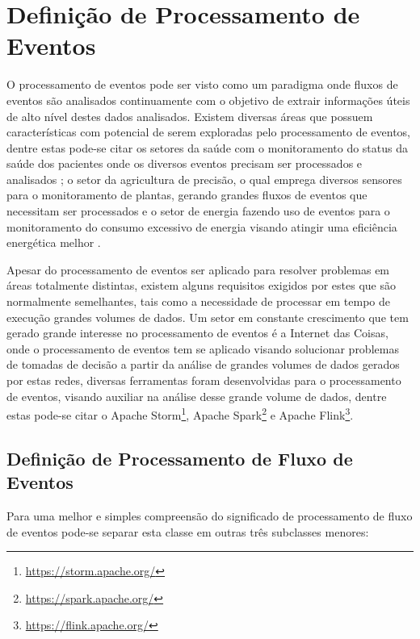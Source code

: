 \documentclass[ti,table]{texufpel} %
\begin{document}
\section{Definição de Processamento de Eventos} 

O processamento de eventos pode ser visto como um paradigma onde fluxos de eventos são analisados continuamente com o objetivo de extrair informações úteis de alto nível destes dados analisados. Existem diversas áreas que possuem características com potencial de serem exploradas pelo processamento de eventos, dentre estas pode-se citar os setores da saúde com o monitoramento do status da saúde dos pacientes onde os diversos eventos precisam ser processados e analisados \cite{weiner2008health}; o setor da agricultura de precisão, o qual emprega diversos sensores para o monitoramento de plantas, gerando grandes fluxos de eventos que necessitam ser processados \cite{garcia2011wireless} e o setor de energia fazendo uso de eventos para o monitoramento do consumo excessivo de energia visando atingir uma eficiência energética melhor \cite{vijayaraghavan2010automated}.  

  

Apesar do processamento de eventos ser aplicado para resolver problemas em áreas totalmente distintas, existem alguns requisitos exigidos por estes que são normalmente semelhantes, tais como a necessidade de processar em tempo de execução grandes volumes de dados. Um setor em constante  crescimento que tem gerado grande interesse no processamento de eventos é a Internet das Coisas, onde o processamento de eventos tem se aplicado visando solucionar problemas de tomadas de decisão a partir da análise de grandes volumes de dados gerados por estas redes, diversas ferramentas foram desenvolvidas para o processamento de eventos, visando auxiliar na análise desse grande volume de dados, dentre estas pode-se citar o Apache Storm\footnote{\url{https://storm.apache.org/}}, Apache Spark\footnote{\url{https://spark.apache.org/}} e Apache Flink\footnote{\url{https://flink.apache.org/}}. 

  

\subsection{Definição de Processamento de Fluxo de Eventos} 

  

Para uma melhor e simples compreensão do significado de processamento de fluxo de eventos pode-se separar esta classe em outras três subclasses menores: 
\end{document}
